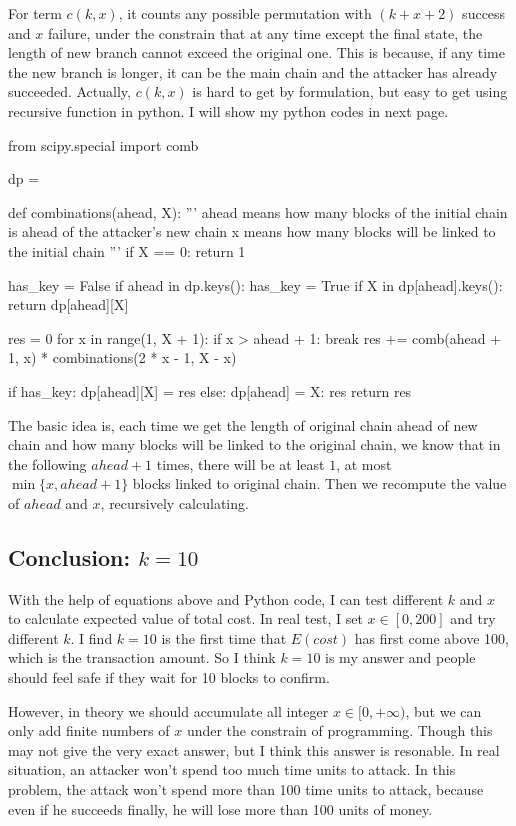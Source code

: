 \documentclass{article}
\begin{document}
For term $c(k,x)$, it counts any possible permutation with $(k+x+2)$ success and $x$ failure, under the constrain that at any time except the final state, the length of new branch cannot exceed the original one. This is because, if any time the new branch is longer, it can be the main chain and the attacker has already succeeded. Actually, $c(k,x)$ is hard to get by formulation, but easy to get using recursive function in python. I will show my python codes in next page.
\newpage
\begin{python}
from scipy.special import comb

dp = {}

def combinations(ahead, X):
    '''
    ahead means how many blocks of the initial chain is ahead of the attacker's new chain
    x means how many blocks will be linked to the initial chain
    '''
    if X == 0:
        return 1

    has_key = False
    if ahead in dp.keys():
        has_key = True
        if X in dp[ahead].keys():
            return dp[ahead][X]
    
    res = 0
    for x in range(1, X + 1):
        if x > ahead + 1:
            break
        res += comb(ahead + 1, x) * combinations(2 * x - 1, X - x)
    
    if has_key:
        dp[ahead][X] = res
    else:
        dp[ahead] = {X: res}
    return res
\end{python}

The basic idea is, each time we get the length of original chain ahead of new chain and how many blocks will be linked to the original chain, we know that in the following $ahead+1$ times, there will be at least $1$, at most $\min\{x,ahead+1\}$ blocks linked to original chain. Then we recompute the value of $ahead$ and $x$, recursively calculating.

\subsection*{Conclusion: $k=10$}
With the help of equations above and Python code, I can test different $k$ and $x$ to calculate expected value of total cost. In real test, I set $x\in[0,200]$ and try different $k$. I find $k=10$ is the first time that $E(cost)$ has first come above 100, which is the transaction amount. So I think $k=10$ is my answer and people should feel safe if they wait for 10 blocks to confirm.

However, in theory we should accumulate all integer $x\in[0,+\infty)$, but we can only add finite numbers of $x$ under the constrain of programming. Though this may not give the very exact answer, but I think this answer is resonable. In real situation, an attacker won't spend too much time units to attack. In this problem, the attack won't spend more than 100 time units to attack, because even if he succeeds finally, he will lose more than 100 units of money.
\end{document}

